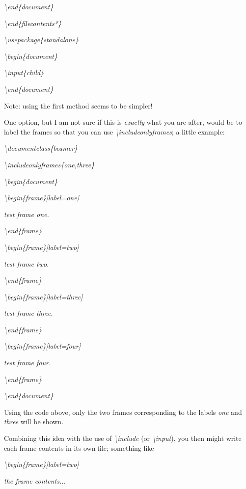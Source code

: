 \emph{\textbackslash{}end\{document\}}

\emph{\textbackslash{}end\{filecontents*\}}

\emph{\textbackslash{}usepackage\{standalone\}}

\emph{\textbackslash{}begin\{document\}}

\emph{ \textbackslash{}input\{child\}}

\emph{\textbackslash{}end\{document\}}

Note: using the first method seems to be simpler!

One option, but I am not sure if this is \emph{exactly} what you are
after, would be to label the frames so that you can use
\emph{\textbackslash{}includeonlyframes}; a little example:

\emph{\textbackslash{}documentclass\{beamer\}}

\emph{\textbackslash{}includeonlyframes\{one,three\}}

\emph{\textbackslash{}begin\{document\}}

\emph{\textbackslash{}begin\{frame\}{[}label=one{]}}

\emph{test frame one.}

\emph{\textbackslash{}end\{frame\}}

\emph{\textbackslash{}begin\{frame\}{[}label=two{]}}

\emph{test frame two.}

\emph{\textbackslash{}end\{frame\}}

\emph{\textbackslash{}begin\{frame\}{[}label=three{]}}

\emph{test frame three.}

\emph{\textbackslash{}end\{frame\}}

\emph{\textbackslash{}begin\{frame\}{[}label=four{]}}

\emph{test frame four.}

\emph{\textbackslash{}end\{frame\}}

\emph{\textbackslash{}end\{document\}}

Using the code above, only the two frames corresponding to the labels
\emph{one} and \emph{three} will be shown.

Combining this idea with the use of \emph{\textbackslash{}include} (or
\emph{\textbackslash{}input}), you then might write each frame contents
in its own file; something like

\emph{\textbackslash{}begin\{frame\}{[}label=two{]}}

\emph{the frame contents...}

